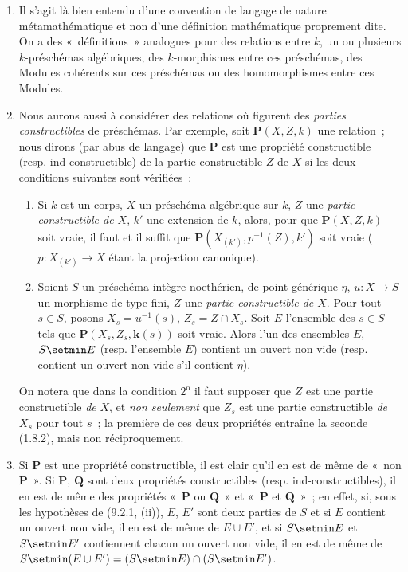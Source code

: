 \begin{remarks}[9.2.2]
\label{IV.9.2.2-fr}
\begin{enumerate}[label=(\roman*)]
  \item Il s'agit là bien entendu d'une convention de langage de nature
  métamathématique et non d'une définition mathématique proprement dite. On a
  des «~définitions~» analogues pour des relations entre $k$, un ou plusieurs
  $k$-préschémas algébriques, des $k$-morphismes entre ces préschémas, des
  Modules cohérents sur ces préschémas ou des homomorphismes entre ces Modules.

  \item Nous aurons aussi à considérer des relations où figurent des
  \emph{parties constructibles} de préschémas. Par exemple, soit
  $\boldsymbol{P}(X,Z,k)$ une relation~; nous dirons (par abus de langage) que
  $\boldsymbol{P}$ est une propriété constructible (resp. ind-constructible) de la
  partie constructible $Z$ de $X$ si les deux conditions suivantes sont
  vérifiées~:
  \begin{enumerate}[label=$\arabic*^{\mathrm o}$]
    \item Si $k$ est un corps, $X$ un préschéma algébrique sur $k$, $Z$ une
    \emph{partie constructible de $X$}, $k'$ une extension de $k$, alors, pour
    que $\boldsymbol{P}(X,Z,k)$ soit vraie, il faut et il suffit que
    $\boldsymbol{P}(X_{(k')},p^{-1}(Z),k')$ soit vraie
    ($p:X_{(k')}\to X$ étant la projection canonique).
    \item Soient $S$ un préschéma intègre noethérien, de point générique
    $\eta$, $u:X\to S$ un morphisme de type fini, $Z$ une
    \emph{partie constructible de $X$}. Pour tout $s\in S$, posons
    $X_s=u^{-1}(s)$, $Z_s=Z\cap X_s$. Soit $E$ l'ensemble des $s\in S$ tels
    que $\boldsymbol{P}(X_s,Z_s,\boldsymbol{k}(s))$ soit vraie. Alors l'un des ensembles $E$,
    $S\setmin E$ (resp. l'ensemble $E$) contient un ouvert non vide (resp. contient
    un ouvert non vide s'il contient $\eta$).
  \end{enumerate}

  On notera que dans la condition $2^{\mathrm o}$ il faut supposer que $Z$ est
  une partie constructible \emph{de} $X$, et \emph{non seulement} que $Z_s$ est une partie
  constructible \emph{de} $X_s$ pour tout $s$~; la première de ces deux propriétés
  entraîne la seconde (1.8.2), mais non réciproquement.

  \item Si $\boldsymbol{P}$ est une propriété constructible, il est clair qu'il en
  est de même de «~non $\boldsymbol{P}$~». Si $\boldsymbol{P}$, $\boldsymbol{Q}$ sont deux
  propriétés constructibles (resp. ind-constructibles), il en est de même des
  propriétés «~$\boldsymbol{P}$ ou $\boldsymbol{Q}$~» et «~$\boldsymbol{P}$ et
  $\boldsymbol{Q}$~»~; en effet, si, sous les hypothèses de (9.2.1, (ii)), $E$,
  $E'$ sont deux parties de $S$ et si $E$ contient un ouvert non vide, il en
  est de même de $E\cup E'$, et si $S\setmin E$ et $S\setmin E'$ contiennent chacun un
  ouvert non vide, il en est de même de
  $S\setmin(E\cup E')=(S\setmin E)\cap(S\setmin E')$.


\end{enumerate}
\end{remarks}
